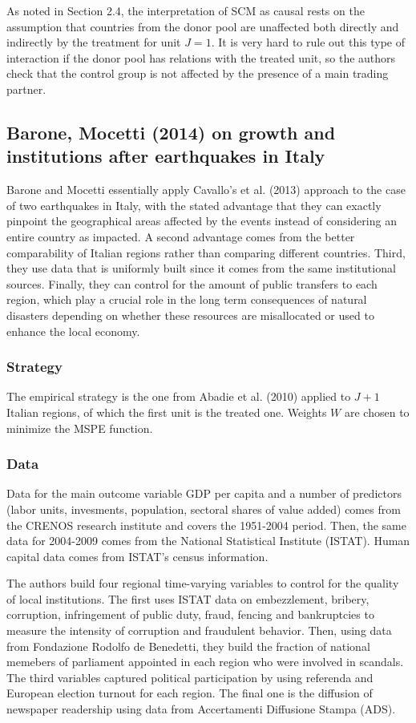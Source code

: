 \documentclass[12pt,a4paper,draft]{article}
\begin{document}
As noted in Section 2.4, the interpretation of SCM as causal rests on the assumption that 
countries from the donor pool are unaffected both directly and indirectly by the treatment for 
unit $J=1$. It is very hard to rule out this type of interaction if the donor pool has relations 
with the treated unit, so the authors check that the control group is not affected by the 
presence of a main trading partner.



\subsection{Barone, Mocetti (2014) on growth and institutions after earthquakes in Italy}
Barone and Mocetti essentially apply Cavallo's et al. (2013) approach to the case of two 
earthquakes in Italy, with the stated advantage that they can exactly pinpoint the geographical 
areas affected by the events instead of considering an entire country as impacted. 
A second advantage comes from the better comparability of Italian 
regions rather than comparing different countries. Third, they use data that is uniformly built 
since it comes from the same institutional sources. Finally, they can control for the amount of 
public transfers to each region, which play a crucial role in the long term consequences of 
natural disasters depending on whether these resources are misallocated or used to enhance the 
local economy.

\subsubsection{Strategy}
The empirical strategy is the one from Abadie et al. (2010) applied to $J+1$ Italian regions, of 
which the first unit is the treated one. 
Weights $W$ are chosen to minimize the MSPE function. 



\subsubsection{Data}
Data for the main outcome variable GDP per capita and a number of predictors (labor 
units, invesments, population, sectoral shares of value added) comes 
from the CRENOS research institute and covers the 1951-2004 period. Then, the same data for 
2004-2009 comes from the National Statistical Institute (ISTAT). Human capital data comes from 
ISTAT's census information.

The authors build four regional time-varying variables to control for the quality of 
local institutions. The first uses ISTAT data on embezzlement, bribery, corruption, infringement 
of public duty, fraud, fencing and bankruptcies to measure the intensity of corruption and 
fraudulent behavior. Then, using data from Fondazione Rodolfo de Benedetti, they build the fraction 
of national memebers of parliament appointed in each region who were involved in scandals. 
The third variables captured political participation by using referenda and European election 
turnout for each region. The final one is the diffusion of newspaper readership using data 
from Accertamenti Diffusione Stampa (ADS).
\end{document}
